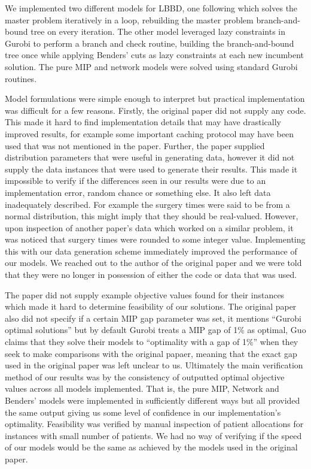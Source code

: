 We implemented two different models for LBBD, one following\cite{roshanaei2017propagating} which solves the master problem iteratively in a loop, rebuilding the master problem branch-and-bound tree on every iteration. The other model leveraged lazy constraints in Gurobi to perform a branch and check routine\cite{LBBDBible}, building the branch-and-bound tree once while applying Benders' cuts as lazy constraints at each new incumbent solution. The pure MIP and network models were solved using standard Gurobi routines. 

Model formulations were simple enough to interpret but practical implementation was difficult for a few reasons. Firstly, the original paper did not supply any code. This made it hard to find implementation details that may have drastically improved results, for example some important caching protocol may have been used that was not mentioned in the paper. Further, the paper supplied distribution parameters that were useful in generating data, however it did not supply the data instances that were used to generate their results. This made it impossible to verify if the differences seen in our results were due to an implementation error, random chance or something else. It also left data inadequately described. For example the surgery times were said to be from a normal distribution, this might imply that they should be real-valued. However, upon inspection of another paper's data which worked on a similar problem\cite{guo}, it was noticed that surgery times were rounded to some integer value. Implementing this with our data generation scheme immediately improved the performance of our models. We reached out to the author of the original paper and we were told that they were no longer in possession of either the code or data that was used. 

The paper did not supply example objective values found for their instances which made it hard to determine feasibility of our solutions. The original paper also did not specify if a certain MIP gap parameter was set, it mentions ``Gurobi optimal solutions'' but by default Gurobi treats a MIP gap of 1\% as optimal, Guo claims that they solve their models to ``optimality with a gap of 1\%'' when they seek to make comparisons with the original papaer, meaning that the exact gap used in the original paper was left unclear to us. Ultimately the main verification method of our results was by the consistency of outputted optimal objective values across all models implemented. That is, the pure MIP, Network and Benders' models were implemented in sufficiently different ways but all provided the same output giving us some level of confidence in our implementation's optimality. Feasibility was verified by manual inspection of patient allocations for instances with small number of patients. We had no way of verifying if the speed of our models would be the same as achieved by the models used in the original paper.